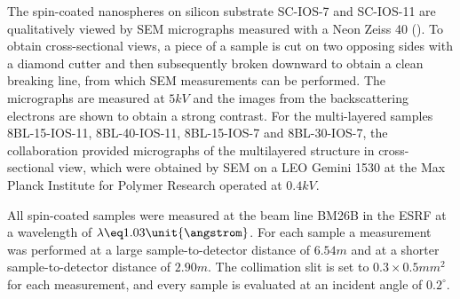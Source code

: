 \documentclass[\main/dresen_thesis.tex]{subfiles}
\begin{document}
    The spin-coated nanospheres on silicon substrate SC-IOS-7 and SC-IOS-11 are qualitatively viewed by SEM micrographs measured with a Neon Zeiss 40 ().
    To obtain cross-sectional views, a piece of a sample is cut on two opposing sides with a diamond cutter and then subsequently broken downward to obtain a clean breaking line, from which SEM measurements can be performed.
    The micrographs are measured at $5 \unit{kV}$ and the images from the backscattering electrons are shown to obtain a strong contrast.
    For the multi-layered samples 8BL-15-IOS-11, 8BL-40-IOS-11, 8BL-15-IOS-7 and 8BL-30-IOS-7, the collaboration provided micrographs of the multilayered structure in cross-sectional view, which were obtained by SEM on a LEO Gemini 1530 at the Max Planck Institute for Polymer Research operated at $0.4 \unit{kV}$.

    All spin-coated samples were measured at the beam line BM26B  in the ESRF at a wavelength of $\lambda \eq 1.03 \unit{\angstrom}$.
    For each sample a measurement was performed at a large sample-to-detector distance of $6.54 \unit{m}$ and at a shorter sample-to-detector distance of $2.90 \unit{m}$.
    The collimation slit is set to $0.3 \times 0.5 \unit{mm^2}$ for each measurement, and every sample is evaluated at an incident angle of $0.2 ^\circ$.
\end{document}
